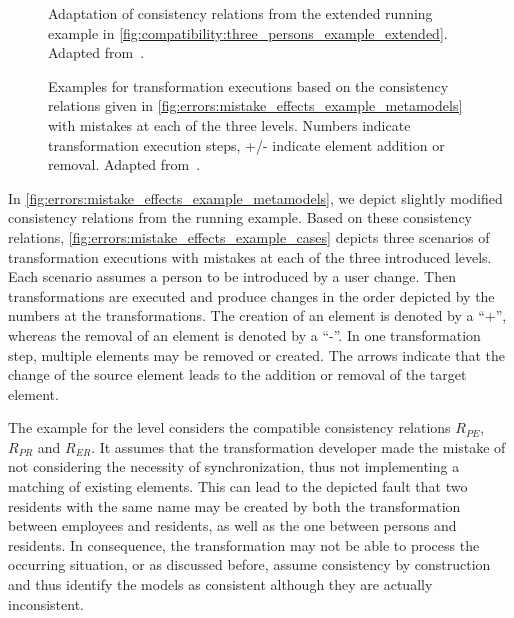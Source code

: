 \begin{figure}
    \centering
    
    \caption[Adaptation of consistency relations from running example]{Adaptation of consistency relations from the extended running example in \autoref{fig:compatibility:three_persons_example_extended}. Adapted from~.}
    \label{fig:errors:mistake_effects_example_metamodels}
\end{figure}

\begin{figure}
    \centering
    
    \caption[Examples for mistakes at each level]{Examples for transformation executions based on the consistency relations given in \autoref{fig:errors:mistake_effects_example_metamodels} with mistakes at each of the three levels. Numbers indicate transformation execution steps, +/- indicate element addition or removal. Adapted from~.}
    \label{fig:errors:mistake_effects_example_cases}
\end{figure}

In \autoref{fig:errors:mistake_effects_example_metamodels}, we depict slightly modified consistency relations from the running example.
Based on these consistency relations, \autoref{fig:errors:mistake_effects_example_cases} depicts three scenarios of transformation executions with mistakes at each of the three introduced levels.
Each scenario assumes a person to be introduced by a user change.
Then transformations are executed and produce changes in the order depicted by the numbers at the transformations.
The creation of an element is denoted by a \enquote{+}, whereas the removal of an element is denoted by a \enquote{-}.
In one transformation step, multiple elements may be removed or created.
The arrows indicate that the change of the source element leads to the addition or removal of the target element.

The example for the \leveltransformation level considers the compatible consistency relations $R_{PE}$, $R_{PR}$ and $R_{ER}$. It assumes that the transformation developer made the mistake of not considering the necessity of synchronization, thus not implementing a matching of existing elements.
This can lead to the depicted fault that two residents with the same name may be created by both the transformation between employees and residents, as well as the one between persons and residents.
In consequence, the transformation may not be able to process the occurring situation, or as discussed before,  assume consistency by construction and thus identify the models as consistent although they are actually inconsistent.

